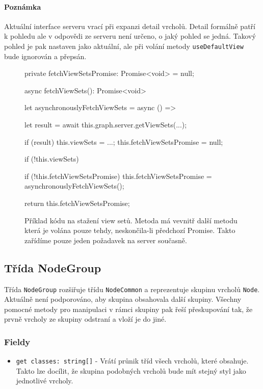 \paragraph{Poznámka} Aktuální interface serveru vrací při expanzi detail vrcholů. Detail formálně patří k pohledu ale v odpovědi ze serveru není určeno, o jaký pohled se jedná. Takový pohled je pak nastaven jako aktuální, ale při volání metody \texttt{useDefaultView} bude ignorován a přepsán.


\begin{figure}
\begin{code}
private fetchViewSetsPromise: Promise<void> = null;

async fetchViewSets(): Promise<void> {
    let asynchronouslyFetchViewSets = async () => {
        let result = await this.graph.server.getViewSets(...);

        if (result) {
            this.viewSets = ...;
        }
        this.fetchViewSetsPromise = null;
    }

    if (!this.viewSets) {
        if (!this.fetchViewSetsPromise) {
            this.fetchViewSetsPromise = asynchronouslyFetchViewSets();
        }

        return this.fetchViewSetsPromise;
    }
}
\end{code}
\label{fetchViewSets}
\caption{Příklad kódu na stažení view setů. Metoda má vevnitř další metodu která je volána pouze tehdy, neskončila-li předchozí Promise. Takto zařídíme pouze jeden požadavek na server současně.}
\end{figure}

\subsection{Třída NodeGroup}
Třída \texttt{NodeGroup} rozšiřuje třídu \texttt{NodeCommon} a reprezentuje skupinu vrcholů \texttt{Node}. Aktuálně není podporováno, aby skupina obsahovala další skupiny. Všechny pomocné metody pro manipulaci v rámci skupiny pak řeší přeskupování tak, že prvně vrcholy ze skupiny odstraní a vloží je do jiné.



\subsubsection*{Fieldy}
\begin{itemize}
  \item \texttt{get classes: string[]} - Vrátí průnik tříd všech vrcholů, které obsahuje. Takto lze docílit, že skupina podobných vrcholů bude mít stejný styl jako jednotlivé vrcholy.
\end{itemize}

